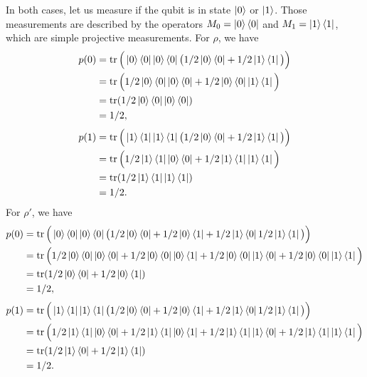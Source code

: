 In both cases, let us measure if the qubit is in state $\ket{0}$ or $\ket{1}$. Those measurements are described by the operators $M_0 = \ket{0}\bra{0}$ and $M_1 = \ket{1}\bra{1}$, which are simple projective measurements. For $\rho$, we have
\begin{align}
    p(0) &= \operatorname{tr}\Big(\ket{0}\bra{0}\ket{0}\bra{0}\big(1/2 \ket{0}\bra{0} + 1/2 \ket{1}\bra{1}\big)\Big)\\
         &= \operatorname{tr}\Big(1/2 \ket{0}\bra{0}\ket{0}\bra{0} + 1/2 \ket{0}\bra{0}\ket{1}\bra{1}\Big)\\
         &= \operatorname{tr}(1/2 \ket{0}\bra{0}\ket{0}\bra{0})\\
         &= 1/2,
\end{align}
\begin{align}
    p(1) &= \operatorname{tr}\Big(\ket{1}\bra{1}\ket{1}\bra{1}\big(1/2 \ket{0}\bra{0} + 1/2 \ket{1}\bra{1}\big)\Big)\\
         &= \operatorname{tr}\Big(1/2 \ket{1}\bra{1}\ket{0}\bra{0} + 1/2 \ket{1}\bra{1}\ket{1}\bra{1}\Big)\\
         &= \operatorname{tr}(1/2 \ket{1}\bra{1}\ket{1}\bra{1})\\
         &= 1/2.
\end{align}
\noindent For $\rho'$, we have
\begin{align}
    p(0) &= \operatorname{tr}\Big(\ket{0}\bra{0}\ket{0}\bra{0}\big(1/2 \ket{0}\bra{0} + 1/2 \ket{0}\bra{1} + 1/2 \ket{1}\bra{0} 1/2 \ket{1}\bra{1}\big)\Big)\\
         &= \operatorname{tr}\Big(1/2 \ket{0}\bra{0}\ket{0}\bra{0} +1/2 \ket{0}\bra{0}\ket{0}\bra{1} + 1/2 \ket{0}\bra{0}\ket{1}\bra{0} + 1/2 \ket{0}\bra{0}\ket{1}\bra{1}\Big)\\
         &= \operatorname{tr}(1/2 \ket{0}\bra{0} + 1/2 \ket{0}\bra{1})\\
         &= 1/2,
\end{align}
\begin{align}
    p(1) &= \operatorname{tr}\Big(\ket{1}\bra{1}\ket{1}\bra{1}\big(1/2 \ket{0}\bra{0} + 1/2 \ket{0}\bra{1} + 1/2 \ket{1}\bra{0} 1/2 \ket{1}\bra{1}\big)\Big)\\
         &= \operatorname{tr}\Big(1/2 \ket{1}\bra{1}\ket{0}\bra{0} +1/2 \ket{1}\bra{1}\ket{0}\bra{1} + 1/2 \ket{1}\bra{1}\ket{1}\bra{0} + 1/2 \ket{1}\bra{1}\ket{1}\bra{1}\Big)\\
         &= \operatorname{tr}(1/2 \ket{1}\bra{0} + 1/2 \ket{1}\bra{1})\\
         &= 1/2.
\end{align}


